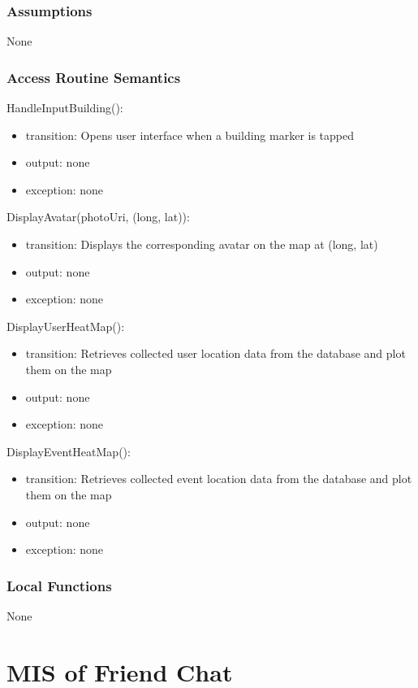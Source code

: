 \documentclass[12pt, titlepage]{article}
\begin{document}
\subsubsection{Assumptions}

None

\subsubsection{Access Routine Semantics}

\noindent HandleInputBuilding():
\begin{itemize}
\item transition: Opens user interface when a building marker is tapped
\item output: none
\item exception: none
\end{itemize}

\noindent DisplayAvatar(photoUri, (long, lat)):
\begin{itemize}
\item transition: Displays the corresponding avatar on the map at (long, lat)
\item output: none
\item exception: none
\end{itemize}

\noindent DisplayUserHeatMap():
\begin{itemize}
\item transition: Retrieves collected user location data from the database and plot them on the map
\item output: none
\item exception: none
\end{itemize}

\noindent DisplayEventHeatMap():
\begin{itemize}
\item transition: Retrieves collected event location data from the database and plot them on the map
\item output: none
\item exception: none
\end{itemize}

\subsubsection{Local Functions}

None

\newpage

\section{MIS of Friend Chat} \label{mFC}
\end{document}
